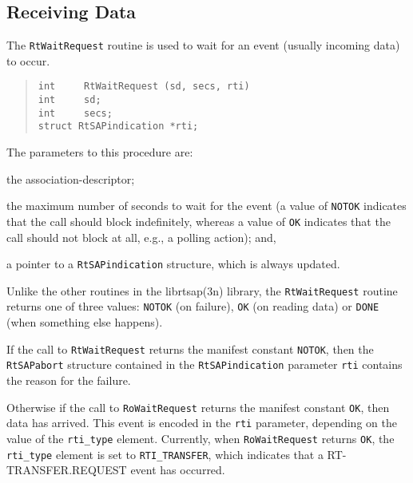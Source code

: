 \subsection	{Receiving Data}
The \verb"RtWaitRequest" routine is used to wait for an event
(usually incoming data) to occur.
\begin{quote}\small\begin{verbatim}
int     RtWaitRequest (sd, secs, rti)
int     sd;
int     secs;
struct RtSAPindication *rti;
\end{verbatim}\end{quote}
The parameters to this procedure are:
\begin{describe}
\item[\verb"sd":] the association-descriptor;

\item[\verb"secs":] the maximum number of seconds to wait for the event
(a value of \verb"NOTOK" indicates that the call should block indefinitely,
whereas a value of \verb"OK" indicates that the call should not block at all,
e.g., a polling action);
and,

\item[\verb"rti":] a pointer to a \verb"RtSAPindication" structure,
which is always updated.
\end{describe}
Unlike the other routines in the \man librtsap(3n) library,
the \verb"RtWaitRequest" routine returns one of three values:
\verb"NOTOK" (on failure),
\verb"OK" (on reading data)
or
\verb"DONE" (when something else happens).

If the call to \verb"RtWaitRequest" returns the manifest constant
\verb"NOTOK",
then the \verb"RtSAPabort" structure contained in
the \verb"RtSAPindication" parameter
\verb"rti" contains the reason for the failure.

Otherwise if the call to \verb"RoWaitRequest" returns the manifest constant
\verb"OK",
then data has arrived.
This event is encoded in the \verb"rti" parameter,
depending on the value of the \verb"rti_type" element.
Currently,
when \verb"RoWaitRequest" returns \verb"OK",
the \verb"rti_type" element is set to \verb"RTI_TRANSFER",
which indicates that a {\sf RT-TRANSFER.REQUEST\/} event has occurred.

